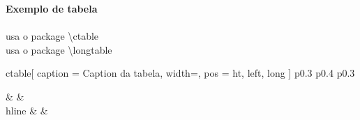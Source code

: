 \documentclass[12pt,a4paper]{article}
\begin{document}
\noindent{}\textbf{Exemplo de tabela}\\
\\ usa o package \textbackslash{ctable}
\\ usa o package \textbackslash{longtable}

ctable[
	caption = {Caption da tabela}, 
	width=\textwidth, pos = ht, left, long
]
{
	p{0.3\textwidth}
	p{0.4\textwidth}
	p{0.3\textwidth}
}
{
	{} &
	{} & 
	{}
	\\hline
	{} &
	{} & 
	{}

}
\end{document}
